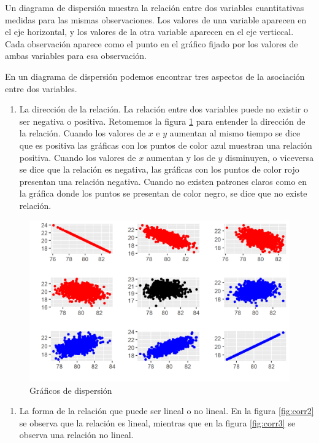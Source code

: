 \documentclass[letterpaper,]{book}
\providecommand{\tightlist}{%
  \setlength{\itemsep}{0pt}\setlength{\parskip}{0pt}}
\begin{document}
Un diagrama de dispersión muestra la relación entre dos variables cuantitativas medidas para las mismas observaciones. Los valores de una variable aparecen en el eje horizontal, y los valores de la otra variable aparecen en el eje verticcal. Cada observación aparece como el punto en el gráfico fijado por los valores de ambas variables para esa observación.

En un diagrama de dispersión podemos encontrar tres aspectos de la asociación entre dos variables.

\begin{enumerate}
\def\labelenumi{\arabic{enumi}.}
\tightlist
\item
  La dirección de la relación. La relación entre dos variables puede no existir o ser negativa o positiva. Retomemos la figura \ref{fig:corr} para entender la dirección de la relación. Cuando los valores de \(x\) e \(y\) aumentan al mismo tiempo se dice que es positiva las gráficas con los puntos de color azul muestran una relación positiva. Cuando los valores de \(x\) aumentan y los de \(y\) disminuyen, o viceversa se dice que la relación es negativa, las gráficas con los puntos de color rojo presentan una relación negativa. Cuando no existen patrones claros como en la gráfica donde los puntos se presentan de color negro, se dice que no existe relación.
\end{enumerate}

\begin{figure}[h]

{\centering \includegraphics[width=0.5\linewidth]{corr} 

}

\caption{Gráficos de dispersión}\label{fig:corr}
\end{figure}

\begin{enumerate}
\def\labelenumi{\arabic{enumi}.}
\setcounter{enumi}{1}
\tightlist
\item
  La forma de la relación que puede ser lineal o no lineal. En la figura \ref{fig:corr2} se observa que la relación es lineal, mientras que en la figura \ref{fig:corr3} se observa una relación no lineal.
\end{enumerate}
\end{document}

